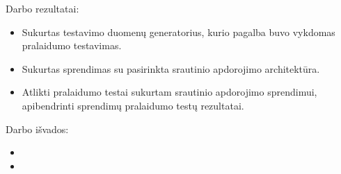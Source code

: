 \documentclass{VUMIFPSkursinis}
\begin{document}

Darbo rezultatai:
\begin{itemize}
    \item Sukurtas testavimo duomenų generatorius, kurio pagalba buvo vykdomas pralaidumo testavimas.
    \item Sukurtas sprendimas su pasirinkta srautinio apdorojimo architektūra.
    \item Atlikti pralaidumo testai sukurtam srautinio apdorojimo sprendimui, apibendrinti sprendimų pralaidumo testų rezultatai.
\end{itemize}

Darbo išvados:
\begin{itemize}
\item 
\item
\end{itemize}

\printbibliography[heading=bibintoc] 
\end{document}
